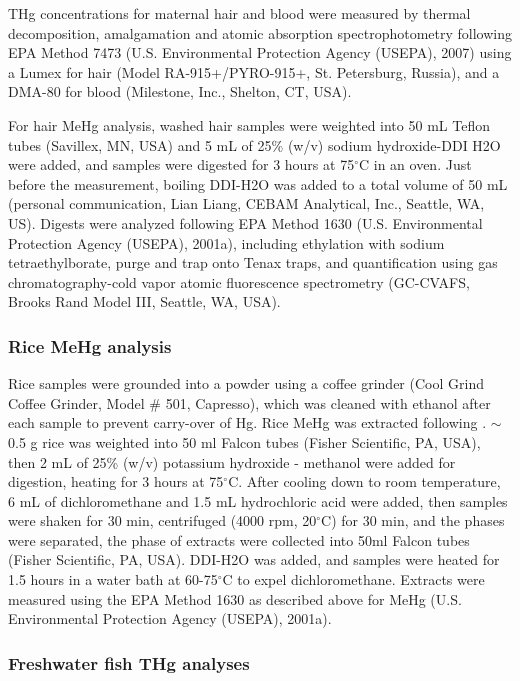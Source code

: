THg concentrations for maternal hair and blood were measured by thermal decomposition, amalgamation and atomic absorption spectrophotometry following EPA Method 7473 (U.S. Environmental Protection Agency (USEPA), 2007) using a Lumex for hair (Model RA-915+/PYRO-915+, St. Petersburg, Russia), and a DMA-80 for blood (Milestone, Inc., Shelton, CT, USA).

For hair MeHg analysis, washed hair samples were weighted into 50 mL Teflon tubes (Savillex, MN, USA) and 5 mL of 25\% (w/v) sodium hydroxide-DDI H2O were added, and samples were digested for 3 hours at 75\({^\circ}\)C in an oven. Just before the measurement, boiling DDI-H2O was added to a total volume of 50 mL (personal communication, Lian Liang, CEBAM Analytical, Inc., Seattle, WA, US). Digests were analyzed following EPA Method 1630 (U.S. Environmental Protection Agency (USEPA), 2001a), including ethylation with sodium tetraethylborate, purge and trap onto Tenax traps, and quantification using gas chromatography-cold vapor atomic fluorescence spectrometry (GC-CVAFS, Brooks Rand Model III, Seattle, WA, USA). 

\subsubsection{Rice MeHg analysis}

Rice samples were grounded into a powder using a coffee grinder (Cool Grind Coffee Grinder, Model \# 501, Capresso), which was cleaned with ethanol after each sample to prevent carry-over of Hg. Rice MeHg was extracted following \cite{liang1996simple}. \({\sim}\)0.5 g rice was weighted into 50 ml Falcon tubes (Fisher Scientific, PA, USA), then 2 mL of 25\% (w/v) potassium hydroxide - methanol were added for digestion, heating for 3 hours at 75\({^\circ}\)C. After cooling down to room temperature, 6 mL of dichloromethane and 1.5 mL hydrochloric acid were added, then samples were shaken for 30 min, centrifuged  (4000 rpm, 20\({^\circ}\)C) for 30 min, and the phases were separated, the phase of extracts were collected into 50ml Falcon tubes (Fisher Scientific, PA, USA). DDI-H2O was added, and samples were heated for 1.5 hours in a water bath at 60-75\({^\circ}\)C to expel dichloromethane. Extracts were measured using the EPA Method 1630 as described above for MeHg (U.S. Environmental Protection Agency (USEPA), 2001a).

\subsubsection{Freshwater fish THg analyses}

